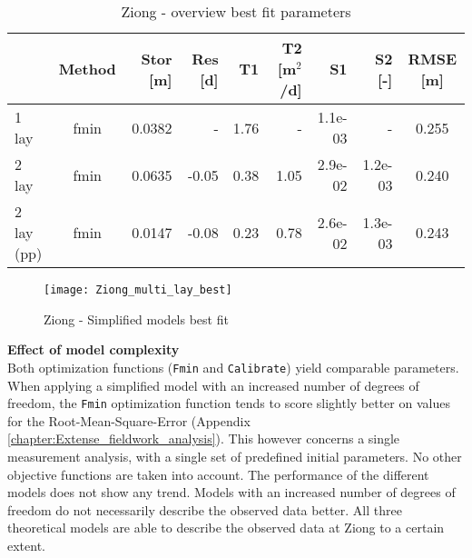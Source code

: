 \begin{table}[h!]
\small
\centering
\caption{Ziong - overview best fit parameters}
\label{tab:Ziong_table}
\begin{tabular}{l|c|r|r|rr|rr|c}
\hline 
\textbf{}       & \textbf{Method} & \textbf{Stor [m]} & \textbf{Res [d]} & \textbf{T1}  & \textbf{T2   [m$^2$/d]}  & \textbf{S1}  & \textbf{S2 [-]}  & \textbf{RMSE [m]} \\ \hline \hline
1 lay                     & fmin             & 0.0382        & -            & 1.76      & -         & 1.1e-03    & -          & 0.255 \\
2 lay                     & fmin             & 0.0635        & -0.05        & 0.38      & 1.05      & 2.9e-02    & 1.2e-03    & 0.240 \\
2 lay (pp)                & fmin             & 0.0147        & -0.08        & 0.23      & 0.78      & 2.6e-02    & 1.3e-03    & 0.243 \\ \hline    
\end{tabular}
\end{table}

\begin{figure}[h!]
 \centering
 \texttt{[image: Ziong\_multi\_lay\_best]}
 \captionsetup{justification=centering} 
 \caption{Ziong - Simplified models best fit}
 \label{fig:Ziong_best}
\end{figure}

\textbf{Effect of model complexity} \\
Both optimization functions (\texttt{Fmin} and \texttt{Calibrate}) yield comparable parameters. When applying a simplified model with an increased number of degrees of freedom, the \texttt{Fmin} optimization function tends to score slightly better on values for the Root-Mean-Square-Error (Appendix \ref{chapter:Extense_fieldwork_analysis}). This however concerns a single measurement analysis, with a single set of predefined initial parameters. No other objective functions are taken into account. The performance of the different models does not show any trend. Models with an  increased number of degrees of freedom do not necessarily describe the observed data better. All three theoretical models are able to describe the observed data at Ziong to a certain extent. \\


%
%

